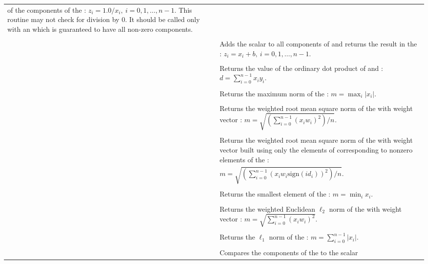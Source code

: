\begin{supertabular}{|p{\colone}|p{\coltwo}|}
of the components of the  :
$z_i = 1.0 /  x_i  , \: i=0,1,\ldots,n-1$. This routine
may not check for division by $0$. It should be called only with an 
 which is guaranteed to have all non-zero components.
\\
%
 &  \\
& Adds the scalar  to all components of  and returns the
result in the  :
$z_i = x_i + b , \: i=0,1,\ldots,n-1$.
\\
%
 &  \\
& Returns the value of the ordinary dot product of  and :
$d=\sum_{i=0}^{n-1} x_i y_i$.
\\
%
 &  \\
& Returns the maximum norm of the  :
$m = \max_{i} | x_i |$.
\\
%
 &  \\
& Returns the weighted root mean square norm of the   with
weight vector :
$m = \sqrt{\left( \sum_{i=0}^{n-1} (x_i w_i)^2 \right) / n}$.
\\
%
 &  \\
& Returns the weighted root mean square norm of the   with
weight vector  built using only the elements of  corresponding to
nonzero elements of the  :\\
&$m = \sqrt{\left( \sum_{i=0}^{n-1} (x_i w_i \text{sign}(id_i))^2 \right) / n}$.
\\
%
 &  \\
& Returns the smallest element of the  :
$m = \min_i x_i $.
\\
%
 &  \\
& Returns the weighted Euclidean $\ell_2$ norm of the  
with weight vector : 
$m = \sqrt{\sum_{i=0}^{n-1} (x_i w_i)^2}$.
\\
%
 &  \\
& Returns the $\ell_1$ norm of the  :
$m = \sum_{i=0}^{n-1} | x_i |$.
\\
%
 &  \\
& Compares the components of the   to the scalar

\end{supertabular}
